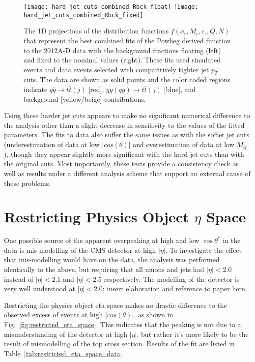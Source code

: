 \documentclass{cmspaperpdf}
\begin{document}
 \begin{figure}[hbt]
  \begin{center}
    \texttt{[image: hard\_jet\_cuts\_combined\_Rbck\_float]}
    \texttt{[image: hard\_jet\_cuts\_combined\_Rbck\_fixed]}
  \caption{\small The 1D projections of the distribution functions $f(x_\mathrm{r},M_\mathrm{r},c_\mathrm{r},Q,N)$ that represent the best combined fits of the Powheg derived function to the 2012A-D data with the background fractions floating (left) and fixed to the nominal values (right). These fits used simulated events and data events selected with comparitively tighter jet $p_{T}$ cuts. The data are shown as solid points and the color coded regions indicate $q\bar q\to t\bar t(j)$ [red], $gg(qg)\to t\bar t(j)$ [blue], and background [yellow/beige] contributions.}
    \label{fig:hard_jet_cuts_fits}
  \end{center}
\end{figure}

Using these harder jet cuts appears to make no significant numerical difference to the analysis other than a slight decrease in sensitivity to the values of the fitted parameters. The fits to data also suffer the same issues as with the softer jet cuts (underestimation of data at low $|cos(\theta)|$ and overestimation of data at low $M_{t\bar{t}}$), though they appear slightly more significant with the hard jet cuts than with the original cuts. Most importantly, these tests provide a consistency check as well as results under a different analysis scheme that support an external cause of these problems.

\section{Restricting Physics Object $\eta$ Space}

One possible source of the apparent overpeaking at high and low $\cos\theta^*$ in the data is mis-modelling of the CMS detector at high $|\eta|$. To investigate the effect that mis-modelling would have on the data, the analysis was performed identically to the above, but requiring that all muons and jets had $|\eta|<2.0$ instead of $|\eta|<2.1$ and $|\eta|<2.5$ respectively. The modelling of the detector is very well understood at $|\eta|<2.0$; insert elaboration and reference to paper here. 

Restricting the physics object eta space makes no drastic difference to the observed excess of events at high $|cos(\theta)|$, as shown in Fig.~\ref{fig:restricted_eta_space}. This indicates that the peaking is not due to a misunderstanding of the detector at high $|\eta|$, but rather it's more likely to be the result of mismodelling of the top cross section. Results of the fit are listed in Table~\ref{tab:restricted_eta_space_data}.
\end{document}
